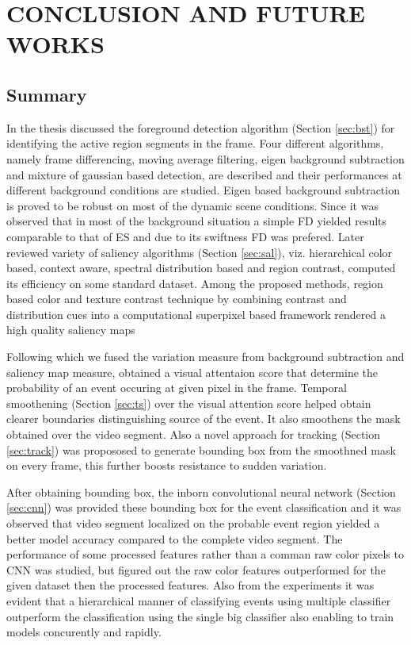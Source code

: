 \chapter{CONCLUSION AND FUTURE WORKS}
\label{chap:concl}

\section{Summary}
In the  thesis discussed the foreground detection algorithm (Section \ref{sec:bst}) for identifying the active region segments in the frame. Four different algorithms, namely frame differencing, moving average filtering, eigen background subtraction and mixture of gaussian based detection, are described and their performances at different background conditions are studied. Eigen based background subtraction is proved to be robust on most of the dynamic scene conditions. Since it was observed that in most of the background situation a simple FD yielded results comparable to that of ES and due to its swiftness FD was prefered. Later reviewed variety of saliency algorithms (Section \ref{sec:sal}), viz. hierarchical color based, context aware, spectral distribution based and region contrast, computed its efficiency on some standard dataset. Among the proposed methods, region based color and texture contrast technique by combining contrast and distribution cues into a computational superpixel based framework rendered a high quality saliency maps

\par Following which we fused the variation measure from background subtraction and saliency map measure, obtained a visual attentaion score that determine the probability of an event occuring at given pixel in the frame. Temporal smoothening (Section \ref{sec:ts}) over the visual attention score helped obtain clearer boundaries distinguishing source of the event. It also smoothens the mask obtained over the video segment. Also a novel approach for tracking (Section \ref{sec:track}) was propososed to generate bounding box from the smoothned mask on every frame, this further boosts resistance to sudden variation.

\par After obtaining bounding box, the inborn convolutional neural network (Section \ref{sec:cnn}) was provided these bounding box for the event classification and it was observed that video segment localized on the probable event region yielded a better model accuracy compared to the complete video segment. The performance of some processed features rather than a comman raw color pixels to CNN was studied, but figured out the raw color features outperformed for the given dataset then the processed features. Also from the experiments it was evident  that a hierarchical manner of classifying events using multiple classifier outperform the classification using the single big classifier also enabling to train models concurently and rapidly.

